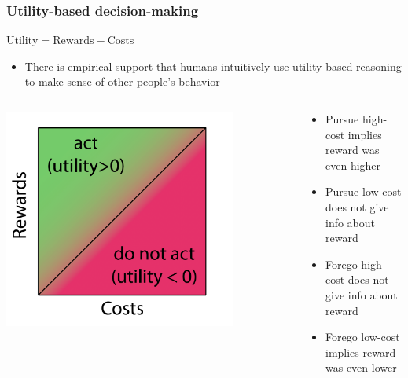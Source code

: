 \documentclass{beamer}
\begin{document}
\begin{frame}
\frametitle{Utility-based decision-making}
\begin{center}
\Large $\text{Utility} = \text{Rewards} - \text{Costs}$
\end{center}
\vspace{0.5cm}
\begin{itemize}
    \item There is empirical support that humans intuitively use utility-based reasoning to make sense of other people's behavior
\end{itemize}
\pause

\vspace{0.5cm}
\begin{columns}
\begin{column}{0.5\textwidth}
\begin{center}
\includegraphics[width=0.8\textwidth]{utility1.png}
\end{center}
\end{column}
\begin{column}{0.5\textwidth}
\pause
\begin{itemize}
    \item Pursue high-cost implies reward was even higher
    \pause
    \item Pursue low-cost does not give info about reward
    \pause
    \item Forego high-cost does not give info about reward
    \pause
    \item Forego low-cost implies reward was even lower
\end{itemize}
\end{column}
\end{columns}
\end{frame}
\end{document}
